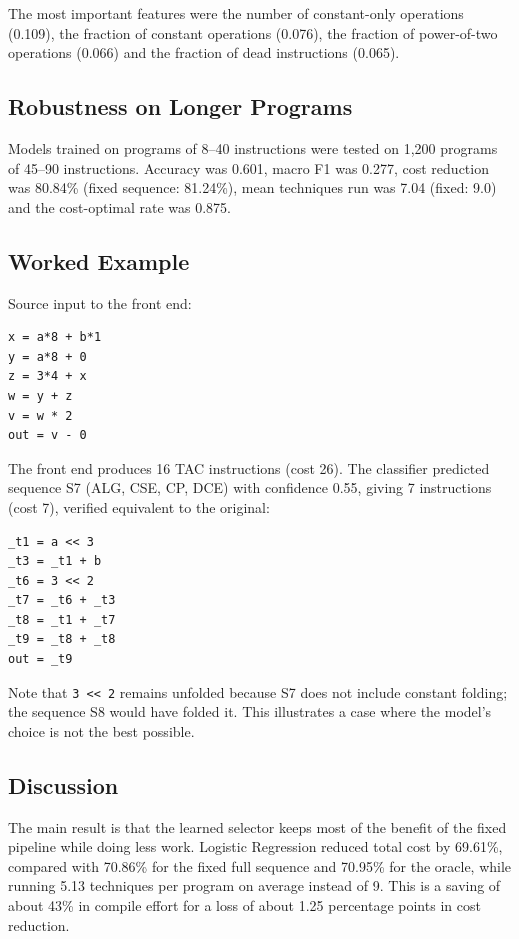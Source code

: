 \documentclass[12pt,a4paper]{article}
\begin{document}
The most important features were the number of constant-only operations
(0.109), the fraction of constant operations (0.076), the fraction of
power-of-two operations (0.066) and the fraction of dead instructions (0.065).

\subsection{Robustness on Longer Programs}

Models trained on programs of 8--40 instructions were tested on 1{,}200 programs
of 45--90 instructions. Accuracy was 0.601, macro F1 was 0.277, cost reduction
was 80.84\% (fixed sequence: 81.24\%), mean techniques run was 7.04 (fixed:
9.0) and the cost-optimal rate was 0.875.

\subsection{Worked Example}

Source input to the front end:

\begin{verbatim}
x = a*8 + b*1
y = a*8 + 0
z = 3*4 + x
w = y + z
v = w * 2
out = v - 0
\end{verbatim}

The front end produces 16 TAC instructions (cost 26). The classifier predicted
sequence S7 (ALG, CSE, CP, DCE) with confidence 0.55, giving 7 instructions
(cost 7), verified equivalent to the original:

\begin{verbatim}
_t1 = a << 3
_t3 = _t1 + b
_t6 = 3 << 2
_t7 = _t6 + _t3
_t8 = _t1 + _t7
_t9 = _t8 + _t8
out = _t9
\end{verbatim}

Note that \verb|3 << 2| remains unfolded because S7 does not include constant
folding; the sequence S8 would have folded it. This illustrates a case where
the model's choice is not the best possible.

\subsection{Discussion}

The main result is that the learned selector keeps most of the benefit of the fixed pipeline while doing less work. Logistic Regression reduced total cost by 69.61\%, compared with 70.86\% for the fixed full sequence and 70.95\% for the oracle, while running 5.13 techniques per program on average instead of 9. This is a saving of about 43\% in compile effort for a loss of about 1.25 percentage points in cost reduction.
\end{document}
